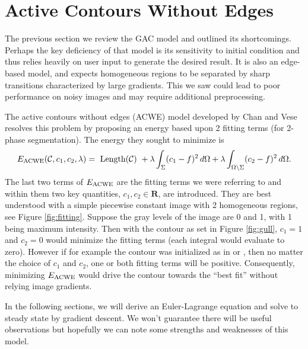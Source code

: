 \chapter{Active Contours Without Edges}
\label{ch:acwe}
The previous section we review the GAC model and outlined its shortcomings. Perhaps the key deficiency of that model is its sensitivity to initial condition and thus relies heavily on user input to generate the desired result. It is also an edge-based model, and expects homogeneous regions to be separated by sharp transitions characterized by large gradients. This we saw could lead to poor performance on noisy images and may require additional preprocessing.

The active contours without edges (ACWE) model developed by Chan and Vese \cite{chan2001active} resolves this problem by proposing an energy based upon 2 fitting terms (for 2-phase segmentation). The energy they sought to minimize is 
\begin{align}
E_\textrm{ACWE}(\mathcal{C}, c_1, c_2, \lambda)
= \textrm{ Length($\mathcal{C}$) } 
+ \lambda \int_{\Sigma} (c_1 - f )^2 \,d\Omega
+ \lambda \int_{\Omega \setminus \Sigma} (c_2 - f )^2 \,d\Omega.
\end{align}
The last two terms of $E_\textrm{ACWE}$ are the fitting terms we were referring to and within them two key quantities, $c_1, c_2 \in \mathbf{R}$, are introduced. They are best understood with a simple piecewise constant image with 2 homogeneous regions, see Figure \ref{fig:fitting}. Suppose the gray levels of the image are 0 and 1, with 1 being maximum intensity. Then with the contour as set in Figure \ref{fig:gull}, $c_1 = 1$ and $c_2 = 0$ would minimize the fitting terms (each integral would evaluate to zero). However if for example the contour was initialized as in  or , then no matter the choice of $c_1$ and $c_2$, one or both fitting terms will be positive. Consequently, minimizing $E_\textrm{ACWE}$ would drive the contour towards the ``best fit'' without relying image gradients.

In the following sections, we will derive an Euler-Lagrange equation and solve to steady state by gradient descent. We won't guarantee there will be useful observations but hopefully we can note some strengths and weaknesses of this model.

